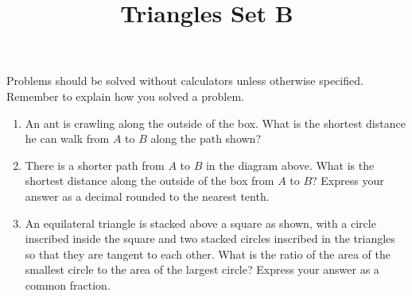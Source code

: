 \documentclass{article}
\title{Triangles Set B}
\date{}
\author{}
\begin{document}
\maketitle
\noindent Problems should be solved without calculators unless otherwise specified.
Remember to explain how you solved a problem.
\begin{multicols}{2}
    \begin{enumerate}
        \item An ant is crawling along the outside of the box.
            What is the shortest distance he can walk from $A$ to $B$ along the path shown?
            \begin{center}
            \end{center}
            \vspace{3cm}
        \item There is a shorter path from $A$ to $B$ in the diagram above.
            What is the shortest distance along the outside of the box from $A$ to $B$?
            Express your answer as a decimal rounded to the nearest tenth.
            \vspace{3cm}
        \item An equilateral triangle is stacked above a square as shown, with a circle inscribed inside the square and two stacked circles inscribed in the triangles so that they are tangent to each other.
            What is the ratio of the area of the smallest circle to the area of the largest circle?
            Express your answer as a common fraction.
            \begin{center}
\end{center}
\end{enumerate}
\end{multicols}
\end{document}
